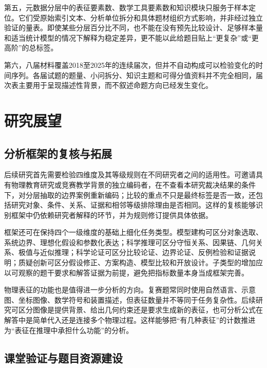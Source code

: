 \documentclass[
  12pt,
  a4paper]{ctexbook}
\begin{document}
第五，元数据分层中的表征要素数、数学工具要素数和知识模块只服务于样本定位。它们受原始索引文本、分析单位拆分和具体题材组织方式影响，并非经过独立验证的量表。即使某些分层百分比不同，也不能在没有预先比较设计、足够样本量和适当统计模型的情况下解释为稳定差异，更不能以此给题目贴上``更复杂''或``更高阶''的总标签。

第六，八届材料覆盖2018至2025年的连续届次，但并不自动构成可以检验变化的时间序列。各届试题的题量、小问拆分、知识主题和可得分值资料并不完全相同，届次表主要用于呈现描述性背景，而不叙述命题方向已经发生变化。

\section{研究展望}\label{ux7814ux7a76ux5c55ux671b}

\subsection{分析框架的复核与拓展}\label{ux5206ux6790ux6846ux67b6ux7684ux590dux6838ux4e0eux62d3ux5c55}

后续研究首先需要检验四维度及其等级规则在不同研究者之间的适用性。可邀请具有物理教育研究或竞赛教学背景的独立编码者，在不查看本研究裁决结果的条件下，对分层抽取的边界案例重新编码；比较的重点不只是最终标签是否一致，还包括研究对象、条件、关系、证据和相邻等级排除理由是否相同。这样的复核能够识别框架中仍依赖研究者解释的环节，并为规则修订提供具体依据。

框架还可在保持四个一级维度的基础上细化任务类型。模型建构可区分对象选取、系统边界、理想化假设和参数化表达；科学推理可区分守恒关系、因果链、几何关系、极值与近似推理；科学论证可区分比较论证、边界论证、反例检验和证据说明；质疑创新可区分假设修正、方案构造、模型比较和开放设计。子类型的增加应以可观察的题干要求和解答证据为前提，避免把指标数量本身当成框架完善。

物理表征的功能也是值得进一步分析的方向。复赛题常同时使用自然语言、示意图、坐标图像、数学符号和装置描述，但表征数量并不等同于任务复杂性。后续研究可区分图像是提供背景、给出几何约束还是要求生成新的表征，也可分析公式在解答中是简单代入还是连接多个物理过程。这样能够把``有几种表征''的计数推进为``表征在推理中承担什么功能''的分析。

\subsection{课堂验证与题目资源建设}\label{ux8bfeux5802ux9a8cux8bc1ux4e0eux9898ux76eeux8d44ux6e90ux5efaux8bbe}
\end{document}
